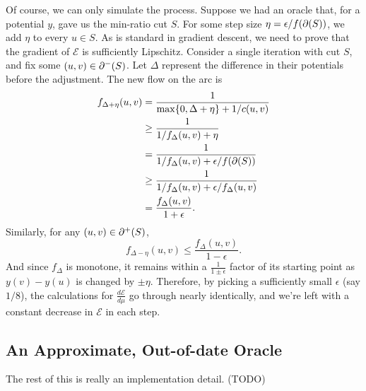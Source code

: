 \documentclass[12 pt]{article}
\begin{document}
Of course, we can only simulate the process. Suppose we had an oracle that, for
a potential $y$, gave us the min-ratio cut $S$. For some step size
$\eta = \epsilon/f(\cut{S})$, we add $\eta$ to every $u \in S$. As is standard
in gradient descent, we need to prove that the gradient of $\mathcal{E}$ is
sufficiently Lipschitz. Consider a single iteration with cut $S$, and fix some
$(u, v) \in \incut S$. Let $\Delta$ represent the difference in their potentials
before the adjustment. The new flow on the arc is
\begin{align*}
  f_{\Delta+\eta}(u, v) & = \frac{1}{\max\Set{0, \Delta + \eta} + 1/c(u, v)}        \\
                        & \geq \frac{1}{1/f_\Delta(u, v) + \eta}                    \\
                        & = \frac{1}{1/f_\Delta(u, v) + \epsilon/f(\cut{S})}        \\
                        & \geq \frac{1}{1/f_\Delta(u, v) + \epsilon/f_\Delta(u, v)} \\
                        & = \frac{f_\Delta(u, v)}{1 + \epsilon}.
\end{align*}
Similarly, for any $(u, v) \in \outcut{S}$,
\[
  f_{\Delta-\eta}(u, v) \leq \frac{f_\Delta(u, v)}{1 - \epsilon}.
\]
And since $f_\Delta$ is monotone, it remains within a $\frac{1}{1 \pm \epsilon}$
factor of its starting point as $y(v) - y(u)$ is changed by $\pm \eta$.
Therefore, by picking a sufficiently small $\epsilon$ (say $1/8$), the
calculations for $\frac{d\mathcal{E}}{d\mu}$ go through nearly identically, and
we're left with a constant decrease in $\mathcal{E}$ in each step.

\subsection{An Approximate, Out-of-date Oracle}

The rest of this is really an implementation detail. (TODO)

\printbibliography
\end{document}
